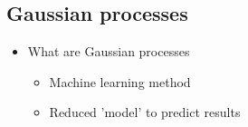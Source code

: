 \documentclass{article}
\begin{document}
\subsection*{Gaussian processes} 
\begin{itemize}
    \item What are Gaussian processes \cite{hornsby_gaussian_2024}
    \begin{itemize}    
        \item Machine learning method
        \item Reduced 'model' to predict results
    \end{itemize}
\end{itemize}

\nocite{*}
\printbibliography[title={References}]
\end{document}
